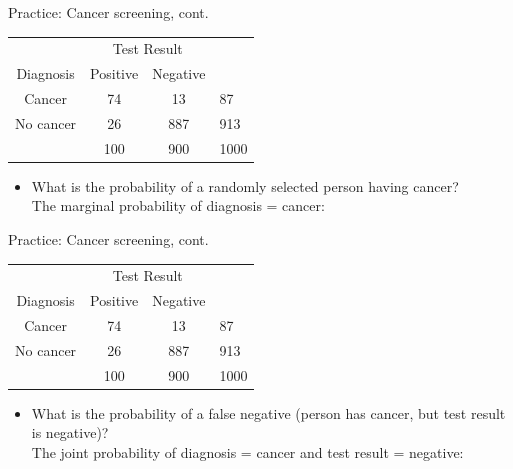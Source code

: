 \documentclass[xcolor=table, aspectratio=169, bigger, handout]{beamer}
\begin{document}
\begin{frame}{Practice: Cancer screening, cont.}
\begin{block}{}
{\centering
\begin{tabular}{c | c  c | l}
\multicolumn{1}{c}{} & \multicolumn{2}{c}{Test Result}\\
Diagnosis & Positive & Negative \\
\hline
Cancer & 74 & 13 & 87\\
No cancer & 26 & 887 & 913\\
\hline
& 100 & 900 & 1000
\end{tabular}\par
}
\end{block}

\begin{exampleblock}{}
\begin{itemize}
\item What is the probability of a randomly selected person having cancer?\\
\pause
\medskip
The marginal probability of diagnosis = cancer:\\
\pause\medskip
\smallskip{}
\end{itemize}
\end{exampleblock}
\end{frame}

\begin{frame}{Practice: Cancer screening, cont.}
\begin{block}{}
{\centering
\begin{tabular}{c | c  c | l}
\multicolumn{1}{c}{} & \multicolumn{2}{c}{Test Result}\\
Diagnosis & Positive & Negative \\
\hline
Cancer & 74 & 13 & 87\\
No cancer & 26 & 887 & 913\\
\hline
& 100 & 900 & 1000
\end{tabular}\par
}
\end{block}

\begin{exampleblock}{}
\begin{itemize}
\item What is the probability of a false negative (person has cancer, but test result is negative)?\\
\pause\medskip
The joint probability of diagnosis = cancer and test result = negative:\\
\pause\medskip
{}
\end{itemize}
\end{exampleblock}
\end{frame}
\end{document}
